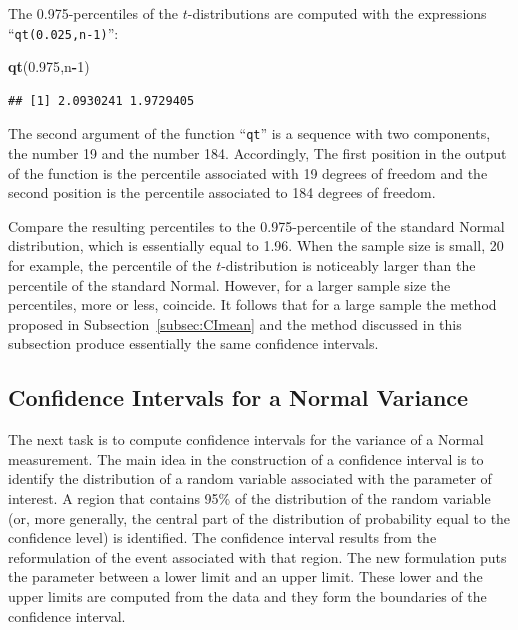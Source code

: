 \documentclass[]{krantz}
\makeatletter
\newenvironment{Shaded}{\begin{snugshade}}{\end{snugshade}}
\newcommand{\KeywordTok}[1]{\textcolor[rgb]{0.13,0.29,0.53}{\textbf{#1}}}
\newcommand{\DecValTok}[1]{\textcolor[rgb]{0.00,0.00,0.81}{#1}}
\newcommand{\FloatTok}[1]{\textcolor[rgb]{0.00,0.00,0.81}{#1}}
\newcommand{\OperatorTok}[1]{\textcolor[rgb]{0.81,0.36,0.00}{\textbf{#1}}}
\newcommand{\NormalTok}[1]{#1}
\newenvironment{kframe}{%
\medskip{}
\setlength{\fboxsep}{.8em}
 \def\at@end@of@kframe{}%
 \ifinner\ifhmode%
  \def\at@end@of@kframe{\end{minipage}}%
  \begin{minipage}{\columnwidth}%
 \fi\fi%
 \def\FrameCommand##1{\hskip\@totalleftmargin \hskip-\fboxsep
 \colorbox{shadecolor}{##1}\hskip-\fboxsep
     \hskip-\linewidth \hskip-\@totalleftmargin \hskip\columnwidth}%
 \MakeFramed {\advance\hsize-\width
   \@totalleftmargin\z@ \linewidth\hsize
   \@setminipage}}%
 {\par\unskip\endMakeFramed%
 \at@end@of@kframe}
\renewenvironment{Shaded}{\begin{kframe}}{\end{kframe}}
\theoremstyle{definition}
\theoremstyle{definition}
\theoremstyle{definition}
\theoremstyle{remark}
\makeatother
\begin{document}
The 0.975-percentiles of the \(t\)-distributions are computed with the
expressions ``\texttt{qt(0.025,n-1)}'':

\begin{Shaded}
\begin{Highlighting}[]
\KeywordTok{qt}\NormalTok{(}\FloatTok{0.975}\NormalTok{,n}\OperatorTok{-}\DecValTok{1}\NormalTok{)}
\end{Highlighting}
\end{Shaded}

\begin{verbatim}
## [1] 2.0930241 1.9729405
\end{verbatim}

The second argument of the function ``\texttt{qt}'' is a sequence with
two components, the number 19 and the number 184. Accordingly, The first
position in the output of the function is the percentile associated with
19 degrees of freedom and the second position is the percentile
associated to 184 degrees of freedom.

Compare the resulting percentiles to the 0.975-percentile of the
standard Normal distribution, which is essentially equal to 1.96. When
the sample size is small, 20 for example, the percentile of the
\(t\)-distribution is noticeably larger than the percentile of the
standard Normal. However, for a larger sample size the percentiles, more
or less, coincide. It follows that for a large sample the method
proposed in Subsection~\ref{subsec:CImean} and the method discussed in
this subsection produce essentially the same confidence intervals.

\subsection{Confidence Intervals for a Normal
Variance}\label{confidence-intervals-for-a-normal-variance}

The next task is to compute confidence intervals for the variance of a
Normal measurement. The main idea in the construction of a confidence
interval is to identify the distribution of a random variable associated
with the parameter of interest. A region that contains 95\% of the
distribution of the random variable (or, more generally, the central
part of the distribution of probability equal to the confidence level)
is identified. The confidence interval results from the reformulation of
the event associated with that region. The new formulation puts the
parameter between a lower limit and an upper limit. These lower and the
upper limits are computed from the data and they form the boundaries of
the confidence interval.
\end{document}
